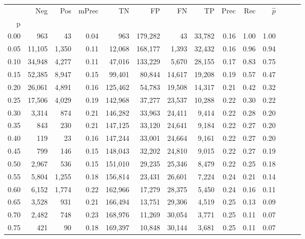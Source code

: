 \begin{tabular}{rrrrrrrrrrrrrr}
\toprule
{} &     Neg &    Pos & mPrec &       TN &       FP &      FN &      TP &  Prec &   Rec & $\hat{p}$ \\
p    &         &        &       &          &          &         &         &       &       &           \\
\midrule
0.00 &     963 &     43 &  0.04 &      963 &  179,282 &      43 &  33,782 &  0.16 &  1.00 &      1.00 \\
0.05 &  11,105 &  1,350 &  0.11 &   12,068 &  168,177 &   1,393 &  32,432 &  0.16 &  0.96 &      0.94 \\
0.10 &  34,948 &  4,277 &  0.11 &   47,016 &  133,229 &   5,670 &  28,155 &  0.17 &  0.83 &      0.75 \\
0.15 &  52,385 &  8,947 &  0.15 &   99,401 &   80,844 &  14,617 &  19,208 &  0.19 &  0.57 &      0.47 \\
0.20 &  26,061 &  4,891 &  0.16 &  125,462 &   54,783 &  19,508 &  14,317 &  0.21 &  0.42 &      0.32 \\
0.25 &  17,506 &  4,029 &  0.19 &  142,968 &   37,277 &  23,537 &  10,288 &  0.22 &  0.30 &      0.22 \\
0.30 &   3,314 &    874 &  0.21 &  146,282 &   33,963 &  24,411 &   9,414 &  0.22 &  0.28 &      0.20 \\
0.35 &     843 &    230 &  0.21 &  147,125 &   33,120 &  24,641 &   9,184 &  0.22 &  0.27 &      0.20 \\
0.40 &     119 &     23 &  0.16 &  147,244 &   33,001 &  24,664 &   9,161 &  0.22 &  0.27 &      0.20 \\
0.45 &     799 &    146 &  0.15 &  148,043 &   32,202 &  24,810 &   9,015 &  0.22 &  0.27 &      0.19 \\
0.50 &   2,967 &    536 &  0.15 &  151,010 &   29,235 &  25,346 &   8,479 &  0.22 &  0.25 &      0.18 \\
0.55 &   5,804 &  1,255 &  0.18 &  156,814 &   23,431 &  26,601 &   7,224 &  0.24 &  0.21 &      0.14 \\
0.60 &   6,152 &  1,774 &  0.22 &  162,966 &   17,279 &  28,375 &   5,450 &  0.24 &  0.16 &      0.11 \\
0.65 &   3,528 &    931 &  0.21 &  166,494 &   13,751 &  29,306 &   4,519 &  0.25 &  0.13 &      0.09 \\
0.70 &   2,482 &    748 &  0.23 &  168,976 &   11,269 &  30,054 &   3,771 &  0.25 &  0.11 &      0.07 \\
0.75 &     421 &     90 &  0.18 &  169,397 &   10,848 &  30,144 &   3,681 &  0.25 &  0.11 &      0.07 \\

\end{tabular}
